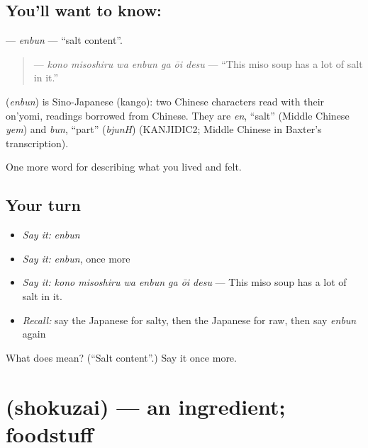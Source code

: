 \subsection*{You'll want to know: }
\textbf{} — \emph{enbun} — \textquotedblleft{}salt content\textquotedblright{}.

\begin{quote}
\textbf{   } — \emph{kono misoshiru wa enbun ga ōi desu} — \textquotedblleft{}This miso soup has a lot of salt in it.\textquotedblright{}
\end{quote}

\begin{cousinweb}
\textbf{} (\emph{enbun}) is Sino-Japanese (kango): two Chinese characters read with their on'yomi, readings borrowed from Chinese. They are \emph{en}, \textquotedblleft{}salt\textquotedblright{} (Middle Chinese \emph{yem}) and \emph{bun}, \textquotedblleft{}part\textquotedblright{} (\emph{bjunH}) (KANJIDIC2; Middle Chinese in Baxter's transcription).
\end{cousinweb}

\begin{grammarlens}[title={What you've built}]
One more word for describing what you lived and felt.
\end{grammarlens}

\subsection*{Your turn}
\begin{itemize}
\raggedright
  \item \emph{Say it:} \emph{enbun}
  \item \emph{Say it:} \emph{enbun}, once more
  \item \emph{Say it:} \emph{kono misoshiru wa enbun ga ōi desu} — This miso soup has a lot of salt in it.
  \item \emph{Recall:} say the Japanese for salty, then the Japanese for raw, then say \emph{enbun} again
\end{itemize}

\begin{tcolorbox}[breakable,colback=teal!4,colframe=teal!35!black,title={Before you move on}]
What does  mean? (\textquotedblleft{}Salt content\textquotedblright{}.) Say it once more.
\end{tcolorbox}
\section[\texorpdfstring{\ja{しょくざい} (shokuzai)}{しょくざい (shokuzai)}]{ (shokuzai) — an ingredient; foodstuff}


